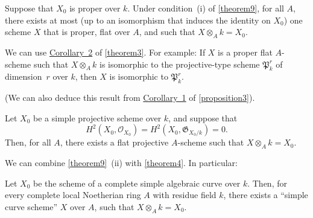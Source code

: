 \documentclass{article}
\theoremstyle{plain}
\newenvironment{corollary}[1]
  {\renewcommand\theinnercustomcorollary{#1}\innercustomcorollary}
  {\endinnercustomcorollary}
\theoremstyle{definition}
\newcommand{\sh}{\mathscr}
\newcommand{\fk}{\mathfrak}
\begin{document}
\begin{corollary}{1}
\label{theorem9corollary1}
  Suppose that $X_0$ is proper over $k$.
  Under condition~(i) of \cref{theorem9}, for all $A$, there exists at most (up to an isomorphism that induces the identity on $X_0$) one scheme $X$ that is proper, flat over $A$, and such that $X\otimes_Ak=X_0$.
\end{corollary}

We can use \hyperref[theorem3corollary2]{Corollary~2} of \cref{theorem3}.
For example:
\begin{corollary}{2}
\label{theorem9corollary2}
  If $X$ is a proper flat $A$-scheme such that $X\otimes_Ak$ is isomorphic to the projective-type scheme $\fk{P}_k^r$ of dimension~$r$ over $k$, then $X$ is isomorphic to $\fk{P}_k^r$.
\end{corollary}

(We can also deduce this result from \hyperref[proposition3corollary1]{Corollary~1} of \cref{proposition3}).

\begin{corollary}{3}
\label{theorem9corollary3}
  Let $X_0$ be a simple projective scheme over $k$, and suppose that
  \[
    H^2(X_0,\sh{O}_{X_0}) = H^2(X_0,\fk{G}_{X_0/k}) = 0.
  \]
  Then, for all $A$, there exists a flat projective $A$-scheme such that $X\otimes_Ak=X_0$.
\end{corollary}

We can combine \cref{theorem9}~(ii) with \cref{theorem4}.
In particular:

\begin{corollary}{4}
\label{theorem9corollary4}
  Let $X_0$ be the scheme of a complete simple algebraic curve over $k$.
  Then, for every complete local Noetherian ring $A$ with residue field $k$, there exists a ``simple curve scheme'' $X$ over $A$, such that $X\otimes_Ak=X_0$.
\end{corollary}
\end{document}
